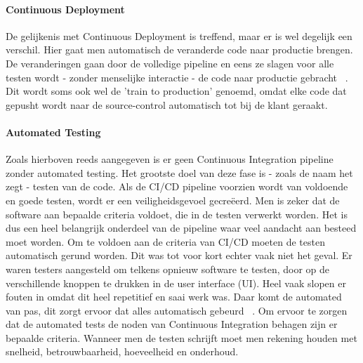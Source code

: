     \paragraph{Continuous Deployment}
    De gelijkenis met Continuous Deployment is treffend, maar er is wel degelijk een verschil.
    Hier gaat men automatisch de veranderde code naar productie brengen. De veranderingen gaan door de volledige pipeline en eens ze slagen voor alle testen wordt - zonder menselijke interactie - de code naar productie gebracht ~\autocite{Claps2015}.
    Dit wordt soms ook wel de 'train to production' genoemd, omdat elke code dat gepusht wordt naar de source-control automatisch tot bij de klant geraakt.
    
    \paragraph{Automated Testing}
    Zoals hierboven reeds aangegeven is er geen Continuous Integration pipeline zonder automated testing. Het grootste doel van deze fase is - zoals de naam het zegt - testen van de code. Als de CI/CD pipeline voorzien wordt van voldoende en goede testen, wordt er een veiligheidsgevoel gecreëerd. Men is zeker dat de software aan bepaalde criteria voldoet, die in de testen verwerkt worden. Het is dus een heel belangrijk onderdeel van de pipeline waar veel aandacht aan besteed moet worden. 
    Om te voldoen aan de criteria van CI/CD moeten de testen automatisch gerund worden. Dit was tot voor kort echter vaak niet het geval. Er waren testers aangesteld om telkens opnieuw software te testen, door op de verschillende knoppen te drukken in de user interface (UI). Heel vaak slopen er fouten in omdat dit heel repetitief en saai werk was. Daar komt de automated van pas, dit zorgt ervoor dat alles automatisch gebeurd ~\autocite{Vocke2018}.
    \newline{}
    Om ervoor te zorgen dat de automated tests de noden van Continuous Integration behagen zijn er bepaalde criteria.
    Wanneer men de testen schrijft moet men rekening houden met snelheid, betrouwbaarheid, hoeveelheid en onderhoud.
    

